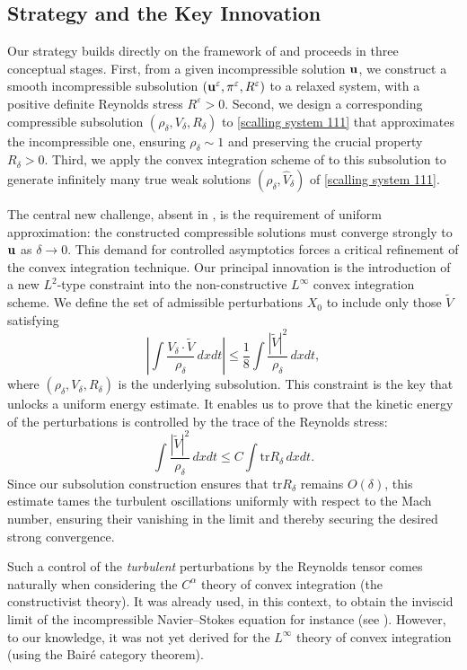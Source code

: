 \documentclass[12pt,reqno]{amsart}
\theoremstyle{definition}
\theoremstyle{remark}
\numberwithin{equation}{section}
\renewcommand{\u}{{\bf u}}
\newcommand{\trace}{\mathrm{tr}}
\newcommand{\eps}{{\varepsilon}}
\begin{document}
\subsection*{Strategy and the Key Innovation}
Our strategy builds directly on the framework of \cite{CVY} and proceeds in three conceptual stages. First, from a given incompressible solution $\u$, we construct a smooth incompressible subsolution $(\u^\eps, \pi^\eps, R^\eps)$ to a relaxed system, with a positive definite Reynolds stress $R^\eps > 0$. Second, we design a corresponding compressible subsolution $(\rho_\delta, V_\delta, R_\delta)$ to \eqref{scalling system 111} that approximates the incompressible one, ensuring $\rho_\delta \sim 1$ and preserving the crucial property $R_\delta > 0$. Third, we apply the convex integration scheme of \cite{CVY} to this subsolution to generate infinitely many true weak solutions $(\rho_\delta, \widehat{V}_\delta)$ of \eqref{scalling system 111}. 

The central new challenge, absent in \cite{CVY}, is the requirement of uniform approximation: the constructed compressible solutions must converge strongly to $\u$ as $\delta \to 0$. This demand for controlled asymptotics forces a critical refinement of the convex integration technique. Our principal innovation is the introduction of a new $L^2$-type constraint into the non-constructive $L^\infty$ convex integration scheme. We define the set of admissible perturbations $X_0$ to include only those $\widetilde{V}$ satisfying
\begin{equation}\label{eq new constr}
\left| \int \frac{V_\delta \cdot \widetilde{V}}{\rho_\delta} \,dxdt \right| \le \frac18 \int \frac{|\widetilde{V}|^2}{\rho_\delta}\,dxdt,
\end{equation}
where $(\rho_\delta, V_\delta, R_\delta)$ is the underlying subsolution. This constraint is the key that unlocks a uniform energy estimate. It enables us to prove that the kinetic energy of the perturbations is controlled by the trace of the Reynolds stress:
\begin{equation}\label{eq unif}
\int \frac{|\widetilde{V}|^2}{\rho_\delta}\,dxdt \le C \int \trace R_\delta \,dxdt.
\end{equation}
Since our subsolution construction ensures that $\trace R_\delta$ remains $O(\delta)$, this estimate 
tames the turbulent oscillations uniformly with respect to the Mach number, ensuring their vanishing in the limit and thereby securing the desired strong convergence.

Such a control of the {\it turbulent} perturbations by the Reynolds tensor comes naturally when considering the $C^\alpha$ theory of convex integration (the constructivist theory). It was already used, in this context,  to obtain the inviscid limit of the incompressible Navier--Stokes equation for instance (see \cite{Annals}). However, to our knowledge, it was not yet derived for the $L^\infty$ theory of convex integration (using the Bair\'e category theorem). 
\end{document}
